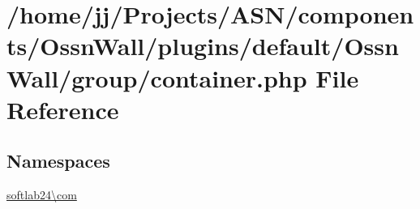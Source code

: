 \hypertarget{_ossn_wall_2group_2container_8php}{}\section{/home/jj/\+Projects/\+A\+S\+N/components/\+Ossn\+Wall/plugins/default/\+Ossn\+Wall/group/container.php File Reference}
\label{_ossn_wall_2group_2container_8php}
\subsection*{Namespaces}
\begin{DoxyCompactItemize}
\item 
 \hyperlink{namespacesoftlab24_1_1com}{softlab24\textbackslash{}com}
\end{DoxyCompactItemize}
